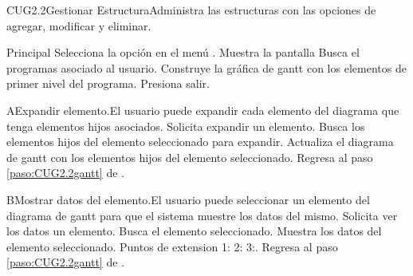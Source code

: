 
	\begin{UseCase}{CUG2.2}{Gestionar Estructura}{Administra las estructuras con las opciones de agregar, modificar y eliminar.}
	\end{UseCase}

	\begin{UCtrayectoria}{Principal}
		\UCpaso[\UCactor] Selecciona la opción  en el menú .
		\UCpaso Muestra la pantalla 
		\UCpaso Busca el programas asociado al usuario.
		\UCpaso Construye la gráfica de gantt con los elementos de primer nivel del programa.    \label{paso:CUG2.2gantt}
		\UCpaso Presiona salir.
	\end{UCtrayectoria}

	\begin{UCtrayectoriaA}{A}{Expandir elemento.}{El usuario puede expandir cada elemento del diagrama que tenga elementos hijos asociados.}
			\UCpaso[\UCactor] Solicita expandir un elemento.
			\UCpaso Busca los elementos hijos del elemento seleccionado para expandir.
			\UCpaso Actualiza el diagrama de gantt con los elementos hijos del elemento seleccionado.
			\UCpaso Regresa al paso \ref{paso:CUG2.2gantt} de .
	\end{UCtrayectoriaA}

	\begin{UCtrayectoriaA}{B}{Mostrar datos del elemento.}{El usuario puede seleccionar un elemento del diagrama de gantt para que el sistema muestre los datos del mismo.}
			\UCpaso[\UCactor] Solicita ver los datos un elemento.
			\UCpaso Busca el elemento seleccionado.
			\UCpaso Muestra los datos del elemento seleccionado. Puntos de extension 1: 2: 3:.
			\UCpaso Regresa al paso \ref{paso:CUG2.2gantt} de . 
	\end{UCtrayectoriaA}
	  
